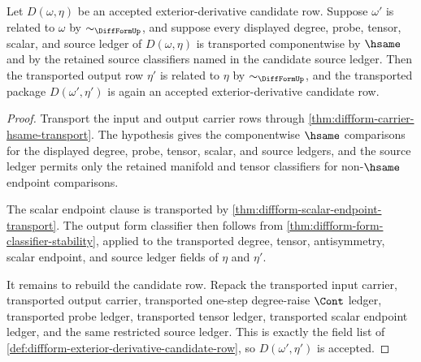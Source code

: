 \begin{theorem}
\label{thm:diffform-exterior-derivative-candidate-classifier-transport}
Let $D(\omega,\eta)$ be an accepted exterior-derivative candidate row. Suppose
$\omega'$ is related to $\omega$ by $\sim_{\DiffFormUp}$, and suppose every
displayed degree, probe, tensor, scalar, and source ledger of
$D(\omega,\eta)$ is transported componentwise by $\hsame$ and by the retained
source classifiers named in the candidate source ledger. Then the transported
output row $\eta'$ is related to $\eta$ by $\sim_{\DiffFormUp}$, and the
transported package $D(\omega',\eta')$ is again an accepted
exterior-derivative candidate row.
\end{theorem}
\begin{proof}
Transport the input and output carrier rows through
\autoref{thm:diffform-carrier-hsame-transport}. The hypothesis gives the
componentwise $\hsame$ comparisons for the displayed degree, probe, tensor,
scalar, and source ledgers, and the source ledger permits only the retained
manifold and tensor classifiers for non-$\hsame$ endpoint comparisons.

The scalar endpoint clause is transported by
\autoref{thm:diffform-scalar-endpoint-transport}. The output form classifier
then follows from \autoref{thm:diffform-form-classifier-stability}, applied to
the transported degree, tensor, antisymmetry, scalar endpoint, and source
ledger fields of $\eta$ and $\eta'$.

It remains to rebuild the candidate row. Repack the transported input carrier,
transported output carrier, transported one-step degree-raise $\Cont$ ledger,
transported probe ledger, transported tensor ledger, transported scalar
endpoint ledger, and the same restricted source ledger. This is exactly the
field list of \autoref{def:diffform-exterior-derivative-candidate-row}, so
$D(\omega',\eta')$ is accepted.
\end{proof}


